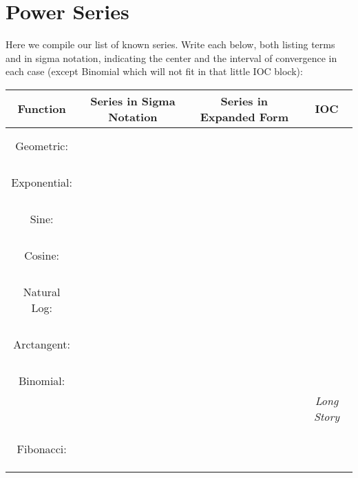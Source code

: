 \section{Power Series }
Here we compile our list of known series.  Write each below, both listing terms and in sigma notation, indicating the center and the interval of convergence in each case (except Binomial which will not fit in that little IOC block): \vspace{.2in}
\begin{center}
\begin{tabular}{|c|c|c|c|} \hline
Function & Series in Sigma Notation & \hspace*{.5in}  Series in Expanded Form \hspace*{.5in} & IOC \\ \hline \hline
& & & \\
& & & \\
Geometric:  & & & \\
& & & \\
& & & \\
& & & \\
& & & \\
Exponential:  & & & \\
& & & \\
& & & \\
& & & \\
& & & \\
Sine:  & & & \\
& & & \\
& & & \\
& & & \\
& & & \\
Cosine:  & & & \\
& & & \\
& & & \\
& & & \\
& & & \\
Natural Log:  & & & \\
& & & \\
& & & \\
& & & \\
& & & \\
Arctangent:  & & & \\
& & & \\
& & & \\
& & & \\
& & & \\
Binomial:  & & &  \\
& & & \emph{Long Story} \\
& & & \\
& & & \\
& & & \\
Fibonacci:  & & & \\
& & & \\
& & & \\
& & & \\\hline
\end{tabular}
\end{center}
